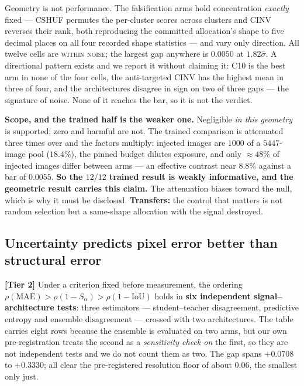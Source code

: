 \documentclass{article} %
\begin{document}
Geometry is not performance. The falsification arms hold concentration \emph{exactly} fixed --- CSHUF
permutes the per-cluster scores across clusters and CINV reverses their rank, both reproducing the
committed allocation's shape to five decimal places on all four recorded shape statistics --- and vary
only direction. All twelve cells are \textsc{within noise}; the largest gap anywhere is $0.0050$ at
$1.82\hat{\sigma}$. A directional pattern exists and we report it without claiming it: C10 is the best
arm in none of the four cells, the anti-targeted CINV has the highest mean in three of four, and the
architectures disagree in sign on two of three gaps --- the signature of noise. None of it reaches the
bar, so it is not the verdict.

\textbf{Scope, and the trained half is the weaker one.} Negligible \emph{in this geometry} is
supported; zero and harmful are not. The trained comparison is attenuated three times over and the
factors multiply: injected images are $1000$ of a $5447$-image pool ($18.4\%$), the pinned budget
dilutes exposure, and only $\approx 48\%$ of injected images differ between arms --- an effective
contrast near $8.8\%$ against a bar of $0.0055$. \textbf{So the $12/12$ trained result is weakly
informative, and the geometric result carries this claim.} The attenuation biases toward the null,
which is why it must be disclosed. \textbf{Transfers:} the control that matters is not random
selection but a same-shape allocation with the signal destroyed.

\subsection{Uncertainty predicts pixel error better than structural error}
\label{sec:diss-ordering}

\textbf{[Tier 2]} Under a criterion fixed before measurement, the ordering
$\rho(\mathrm{MAE}) > \rho(1-S_\alpha) > \rho(1-\mathrm{IoU})$ holds in \textbf{six independent
signal--architecture tests}: three estimators --- student--teacher disagreement, predictive entropy
and ensemble disagreement --- crossed with two architectures. The table carries eight rows because the
ensemble is evaluated on two arms, but our own pre-registration treats the second as a
\emph{sensitivity check on} the first, so they are not independent tests and we do not count them as
two. The gap spans $+0.0708$ to $+0.3330$; all clear the pre-registered resolution floor of about
$0.06$, the smallest only just.
\end{document}
